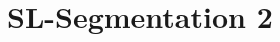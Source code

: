 \documentclass{article}
\begin{document}
\thispagestyle{empty}
\printtitle									%
  	\vfill
\printauthor
\newpage

\tableofcontents
\thispagestyle{empty}
\newpage
\def\BU{SL}
\def\SegmentTwo{2}
\newcommand\SegmentsTwoComponent{SL}

\section{\BU-Segmentation 2}
	
	
\CleanUp
\end{document}
